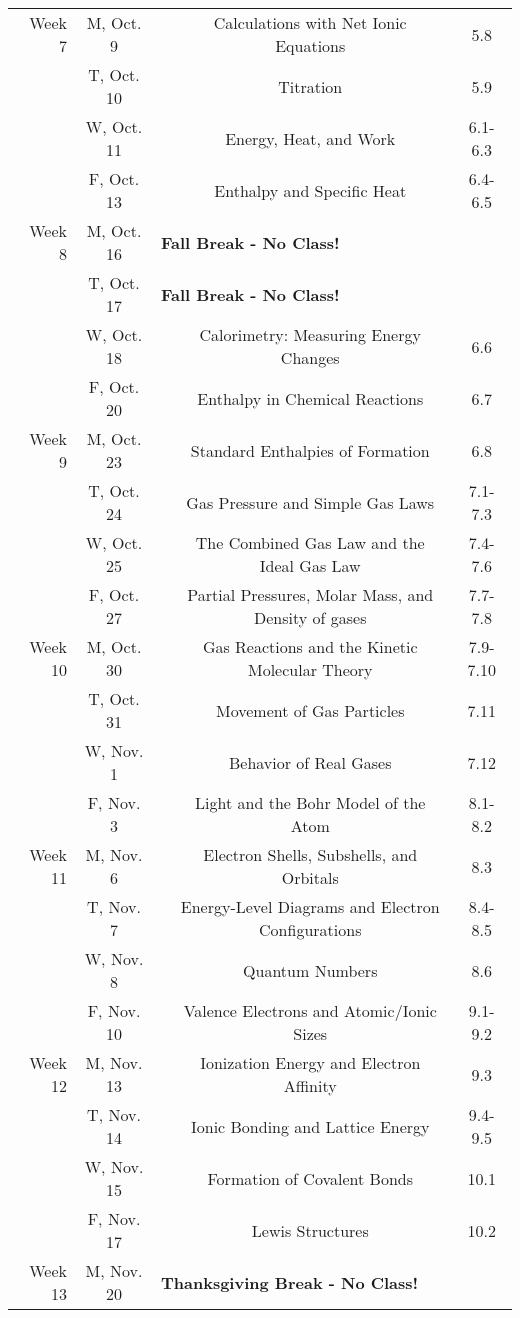 \documentclass[12pt, letterpaper]{article}
\begin{document}
\begin{tabular}{rcccc}
	Week 7 & M, Oct. 9&& Calculations with Net Ionic Equations & 5.8\\
	& T, Oct. 10&& Titration & 5.9\\
	& W, Oct. 11&& Energy, Heat, and Work & 6.1-6.3\\
	& F, Oct. 13&& Enthalpy and Specific Heat & 6.4-6.5\\
	\midrule
	Week 8 & M, Oct. 16& \multicolumn{3}{l}{\textbf{Fall Break - No Class!}}\\
	& T, Oct. 17& \multicolumn{3}{l}{\textbf{Fall Break - No Class!}}\\
	& W, Oct. 18&& Calorimetry: Measuring Energy Changes & 6.6\\
	& F, Oct. 20&& Enthalpy in Chemical Reactions & 6.7\\
	\midrule
	Week 9 & M, Oct. 23&& Standard Enthalpies of Formation & 6.8\\
	& T, Oct. 24&& Gas Pressure and Simple Gas Laws & 7.1-7.3\\
	& W, Oct. 25&& The Combined Gas Law and the Ideal Gas Law & 7.4-7.6\\
	& F, Oct. 27&& Partial Pressures, Molar Mass, and Density of gases & 7.7-7.8\\
	\midrule
	Week 10 & M, Oct. 30&& Gas Reactions and the Kinetic Molecular Theory & 7.9-7.10\\
	& T, Oct. 31&& Movement of Gas Particles & 7.11\\
	& W, Nov. 1&& Behavior of Real Gases & 7.12\\
	& F, Nov. 3&& Light and the Bohr Model of the Atom & 8.1-8.2\\
	\midrule
	Week 11 & M, Nov. 6&& Electron Shells, Subshells, and Orbitals & 8.3\\
	& T, Nov. 7&& Energy-Level Diagrams and Electron Configurations & 8.4-8.5\\
	& W, Nov. 8&& Quantum Numbers & 8.6\\
	& F, Nov. 10&& Valence Electrons and Atomic/Ionic Sizes & 9.1-9.2\\
	\midrule
	Week 12 & M, Nov. 13&& Ionization Energy and Electron Affinity & 9.3\\
	& T, Nov. 14&& Ionic Bonding and Lattice Energy & 9.4-9.5\\
	& W, Nov. 15&& Formation of Covalent Bonds & 10.1\\
	& F, Nov. 17&& Lewis Structures & 10.2\\
	\midrule
	Week 13 & M, Nov. 20& \multicolumn{3}{l}{\textbf{Thanksgiving Break - No Class!}}\\

\end{tabular}
\end{document}
